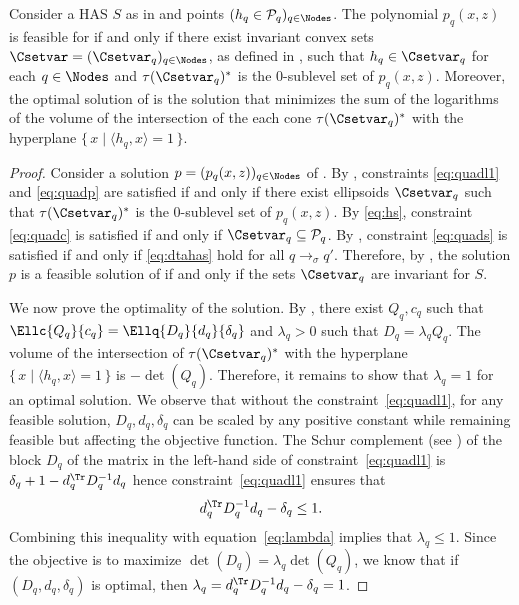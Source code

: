 \documentclass[11pt,twoside,a4paper,openright]{uclouvain-thesis}
\newcommand{\tr}{\to}
\newcommand{\trs}[1][\sigma]{\tr_{#1}}
\newcommand{\Ps}{\mathcal{P}}
\newcommand{\sys}{S}
\newcommand{\dtahas}{HAS}
\begin{document}
\begin{mytheo}
  \label{theo:quad}
  Consider a \dtahas{} $\sys$ as in  and points $(h_q \in \Ps_q)_{q \in \Nodes}$.
  The polynomial $p_q(x, z)$ is feasible for  if and only if
  there exist invariant convex sets $\Csetvar = (\Csetvar_q)_{q \in \Nodes}$,
  as defined in ,
  such that $h_q \in \Csetvar_q$ for each $q \in \Nodes$
  and $\tau(\Csetvar_q)^*$ is the 0-sublevel set of $p_q(x, z)$.
  Moreover, the optimal solution of  is the solution that minimizes
  the sum of the logarithms of the volume of the intersection of the each cone $\tau(\Csetvar_q)^*$ with the hyperplane
  \( \{\, x \mid \langle h_q, x \rangle = 1 \,\}. \)
  \begin{proof}
    Consider a solution $p = (p_q(x, z))_{q \in \Nodes}$ of .
    By , constraints \eqref{eq:quadl1} and \eqref{eq:quadp} are satisfied if and only if there exist ellipsoids $\Csetvar_q$ such that $\tau(\Csetvar_q)^*$ is the 0-sublevel set of $p_q(x, z)$.
    By \eqref{eq:hs}, constraint \eqref{eq:quadc} is satisfied if and only if $\Csetvar_q \subseteq \Ps_q$.
    By , constraint \eqref{eq:quads} is satisfied if and only if
    \eqref{eq:dtahas} hold for all $q \trs q'$.
    Therefore, by , the solution $p$ is a feasible solution of  if and only if the sets $\Csetvar_q$ are invariant for $\sys$.

    We now prove the optimality of the solution.
    By , there exist $Q_q, c_q$ such that $\Ellc{Q_q}{c_q} = \Ellq{D_q}{d_q}{\delta_q}$ and $\lambda_q > 0$ such that $D_q = \lambda_q Q_q$.
    The volume of the intersection of $\tau(\Csetvar_q)^*$ with the hyperplane
    \( \{\, x \mid \langle h_q, x \rangle = 1 \,\} \)
    is $-\det(Q_q)$.
    Therefore, it remains to show that $\lambda_q = 1$ for an optimal solution.
    We observe that without the constraint~\eqref{eq:quadl1}, for any feasible solution, $D_q, d_q, \delta_q$ can be scaled by any positive constant
    while remaining feasible but affecting the objective function.
    The Schur complement (see ) of the block $D_q$ of the matrix in the
    left-hand side of constraint~\eqref{eq:quadl1} is
    $\delta_q + 1 - d_q^\Tr D_q^{-1} d_q$ hence constraint~\eqref{eq:quadl1}
    ensures that
    \[ d_q^\Tr D_q^{-1} d_q - \delta_q \leq 1. \]
    Combining this inequality with equation~\eqref{eq:lambda} implies that $\lambda_q \leq 1$.
    Since the objective is to maximize $\det(D_q) = \lambda_q \det(Q_q)$,
    we know that if $(D_q, d_q, \delta_q)$ is optimal,
    then $\lambda_q = d_q^\Tr D_q^{-1} d_q - \delta_q = 1$.
  \end{proof}
\end{mytheo}
\end{document}
